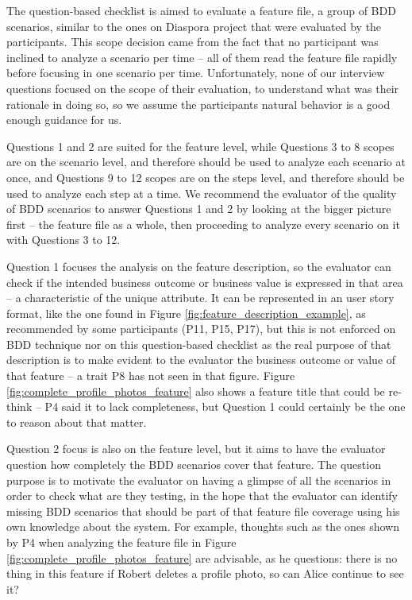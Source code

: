 The question-based checklist is aimed to evaluate a feature file, a group of BDD scenarios, similar to the ones on Diaspora project that were evaluated by the participants. This scope decision came from the fact that no participant was inclined to analyze a scenario per time -- all of them read the feature file rapidly before focusing in one scenario per time. Unfortunately, none of our interview questions focused on the scope of their evaluation, to understand what was their rationale in doing so, so we assume the participants natural behavior is a good enough guidance for us. 

Questions 1 and 2 are suited for the feature level, while Questions 3 to 8 scopes are on the scenario level, and therefore should be used to analyze each scenario at once, and Questions 9 to 12 scopes are on the steps level, and therefore should be used to analyze each step at a time. We recommend the evaluator of the quality of BDD scenarios to answer Questions 1 and 2 by looking at the bigger picture first -- the feature file as a whole, then proceeding to analyze every scenario on it with Questions 3 to 12.

Question 1 focuses the analysis on the feature description, so the evaluator can check if the intended business outcome or business value is expressed in that area -- a characteristic of the unique attribute. It can be represented in an user story format, like the one found in Figure \ref{fig:feature_description_example}, as recommended by some participants (P11, P15, P17), but this is not enforced on BDD technique nor on this question-based checklist as the real purpose of that description is to make evident to the evaluator the business outcome or value of that feature -- a trait P8 has not seen in that figure. Figure \ref{fig:complete_profile_photos_feature} also shows a feature title that could be re-think -- P4 said it to lack completeness, but Question 1 could certainly be the one to reason about that matter.

Question 2 focus is also on the feature level, but it aims to have the evaluator question how completely the BDD scenarios cover that feature. The question purpose is to motivate the evaluator on having a glimpse of all the scenarios in order to check what are they testing, in the hope that the evaluator can identify missing BDD scenarios that should be part of that feature file coverage using his own knowledge about the system. For example, thoughts such as the ones shown by P4 when analyzing the feature file in Figure \ref{fig:complete_profile_photos_feature} are advisable, as he questions: there is no thing in this feature if Robert deletes a profile photo, so can Alice continue to see it?

